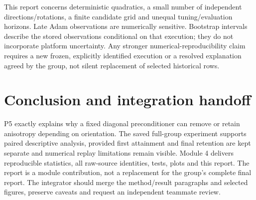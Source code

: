 \documentclass[10pt,a4paper]{article}
\begin{document}
This report concerns deterministic quadratics, a small number of independent
directions/rotations, a finite candidate grid and unequal tuning/evaluation horizons.
Late Adam observations are numerically sensitive. Bootstrap intervals describe
the stored observations conditional on that execution; they do not incorporate
platform uncertainty. Any stronger numerical-reproducibility claim requires a
new frozen, explicitly identified execution or a resolved explanation agreed by
the group, not silent replacement of selected historical rows.

\section{Conclusion and integration handoff}
P5 exactly explains why a fixed diagonal preconditioner can remove or retain
anisotropy depending on orientation. The saved full-group experiment supports
paired descriptive analysis, provided first attainment and final retention are
kept separate and numerical replay limitations remain visible. Module 4 delivers
reproducible statistics, all raw-source identities, tests, plots and this report.
The report is a module contribution, not a replacement for the group's complete
final report. The integrator should merge the method/result paragraphs and
selected figures, preserve caveats and request an independent teammate review.
\end{document}
